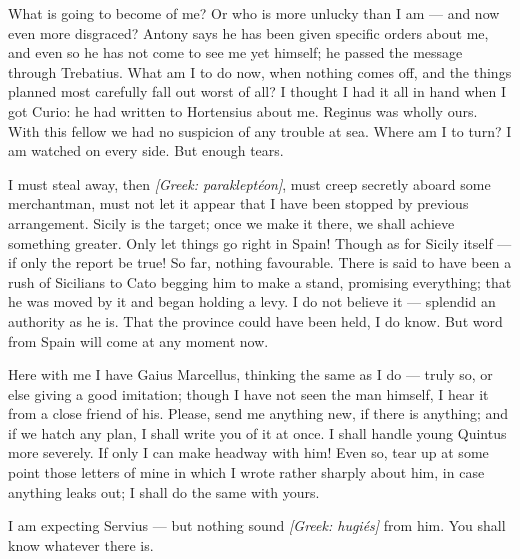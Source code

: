 

 What is going to become of me? Or who is more unlucky than I am --- and now even more disgraced? Antony says he has been given specific orders about me, and even so he has not come to see me yet himself; he passed the message through Trebatius. What am I to do now, when nothing comes off, and the things planned most carefully fall out worst of all? I thought I had it all in hand when I got Curio: he had written to Hortensius about me. Reginus was wholly ours. With this fellow we had no suspicion of any trouble at sea. Where am I to turn? I am watched on every side. But enough tears.

 I must steal away, then \textit{[Greek: parakleptéon]}, must creep secretly aboard some merchantman, must not let it appear that I have been stopped by previous arrangement. Sicily is the target; once we make it there, we shall achieve something greater. Only let things go right in Spain! Though as for Sicily itself --- if only the report be true! So far, nothing favourable. There is said to have been a rush of Sicilians to Cato begging him to make a stand, promising everything; that he was moved by it and began holding a levy. I do not believe it --- splendid an authority as he is. That the province could have been held, I do know. But word from Spain will come at any moment now.

 Here with me I have Gaius Marcellus, thinking the same as I do --- truly so, or else giving a good imitation; though I have not seen the man himself, I hear it from a close friend of his. Please, send me anything new, if there is anything; and if we hatch any plan, I shall write you of it at once. I shall handle young Quintus more severely. If only I can make headway with him! Even so, tear up at some point those letters of mine in which I wrote rather sharply about him, in case anything leaks out; I shall do the same with yours.

 I am expecting Servius --- but nothing sound \textit{[Greek: hugiés]} from him. You shall know whatever there is.
